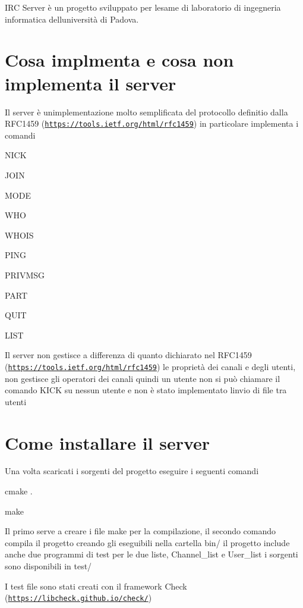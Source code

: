 I\+RC Server è un progetto sviluppato per l\textquotesingle{}esame di laboratorio di ingegneria informatica dell\textquotesingle{}università di Padova.\hypertarget{index_implementazione}{}\section{Cosa implmenta e cosa non implementa il server}\label{index_implementazione}
Il server è un\textquotesingle{}implementazione molto semplificata del protocollo definitio dalla R\+F\+C1459 (\href{https://tools.ietf.org/html/rfc1459}{\tt https\+://tools.\+ietf.\+org/html/rfc1459}) in particolare implementa i comandi
\begin{DoxyItemize}
\item N\+I\+CK
\item J\+O\+IN
\item M\+O\+DE
\item W\+HO
\item W\+H\+O\+IS
\item P\+I\+NG
\item P\+R\+I\+V\+M\+SG
\item P\+A\+RT
\item Q\+U\+IT
\item L\+I\+ST
\end{DoxyItemize}

Il server non gestisce a differenza di quanto dichiarato nel R\+F\+C1459 (\href{https://tools.ietf.org/html/rfc1459}{\tt https\+://tools.\+ietf.\+org/html/rfc1459}) le proprietà dei canali e degli utenti, non gestisce gli operatori dei canali quindi un utente non si può chiamare il comando K\+I\+CK su nessun utente e non è stato implementato l\textquotesingle{}invio di file tra utenti\hypertarget{index_installazione}{}\section{Come installare il server}\label{index_installazione}
Una volta scaricati i sorgenti del progetto eseguire i seguenti comandi
\begin{DoxyItemize}
\item cmake .
\item make
\end{DoxyItemize}

Il primo serve a creare i file make per la compilazione, il secondo comando compila il progetto creando gli eseguibili nella cartella bin/ il progetto include anche due programmi di test per le due liste, Channel\+\_\+list e User\+\_\+list i sorgenti sono disponibili in test/

I test file sono stati creati con il framework Check (\href{https://libcheck.github.io/check/}{\tt https\+://libcheck.\+github.\+io/check/}) 